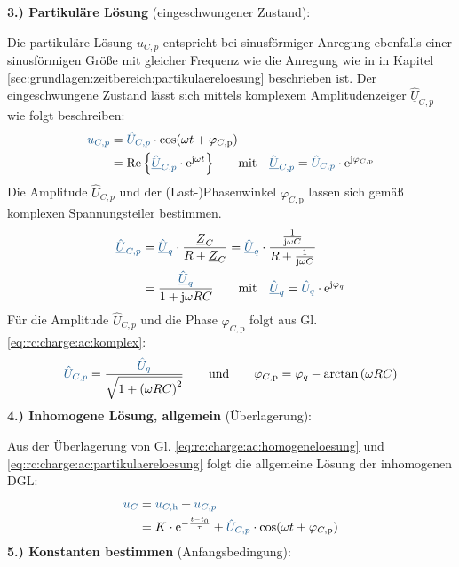 \begin{frame}[t]
{    \textbf{3.) Partikuläre Lösung} (eingeschwungener Zustand):

    Die partikuläre Lösung $u_{C,p}$ entspricht bei sinusförmiger Anregung ebenfalls einer sinusförmigen Größe
    mit gleicher Frequenz wie die Anregung wie in in Kapitel \ref{sec:grundlagen:zeitbereich:partikulaereloesung} beschrieben ist.
    Der eingeschwungene Zustand lässt sich mittels komplexem Amplitudenzeiger $\hat{\underline{U}}_{C,p}$ wie folgt beschreiben:
    \begin{align}
        \ecv{u_{C,p}}
            &= \ecv{\hat{U}_{C,p}} \cdot \cos(\omega t + \varphi_{C,\mathrm{p}})  \label{eq:rc:charge:ac:partikulaereloesung}\\
            &= \Re{\left\{ \ecv{\hat{\underline{U}}_{C,p}} \cdot \mathrm{e}^{\mathrm{j} \omega t} \right\}} \qquad \text{mit}\quad \ecv{\hat{\underline{U}}_{C,p}} = \ecv{\hat{U}_{C,p}} \cdot \mathrm{e}^{\mathrm{j} \varphi_{C,\mathrm{p}}}
    \end{align}
    Die Amplitude $\hat{U}_{C,p}$ und der (Last-)Phasenwinkel $\varphi_{C,\mathrm{p}}$ lassen sich gemäß komplexen Spannungsteiler bestimmen.
    \begin{align}
        \ecv{\hat{\underline{U}}_{C,p}}
            &= \ecv{\hat{\underline{U}}_q} \cdot \frac{\underline{Z}_C}{R + \underline{Z}_C}
            = \ecv{\hat{\underline{U}}_q} \cdot \frac{\frac{1}{\mathrm{j}\omega C}}{R + \frac{1}{\mathrm{j} \omega C}} \nonumber\\
            &= \frac{\ecv{\hat{\underline{U}}_q}}{1 + \mathrm{j} \omega R C}
            \qquad \text{mit}\quad \ecv{\hat{\underline{U}}_q} = \ecv{\hat{U}_q} \cdot \mathrm{e}^{\mathrm{j} \varphi_q}
            \label{eq:rc:charge:ac:komplex}
    \end{align}
    Für die Amplitude $\hat{U}_{C,p}$ und die Phase $\varphi_{C,\mathrm{p}}$ folgt aus Gl. \ref{eq:rc:charge:ac:komplex}:
    \begin{align}
        \ecv{\hat{U}_{C,p}} = \frac{\ecv{\hat{U}_q}}{\sqrt{1 + \left(\omega RC\right)^2}} \qquad\text{und}\qquad
        \varphi_{C,\mathrm{p}} = \varphi_q - \arctan\left(\omega RC\right) \label{rc:charge:ac:amplitudephase}
    \end{align}
    \textbf{4.) Inhomogene Lösung, allgemein} (Überlagerung):

    Aus der Überlagerung von Gl. \ref{eq:rc:charge:ac:homogeneloesung} und \ref{eq:rc:charge:ac:partikulaereloesung}
    folgt die allgemeine Lösung der inhomogenen DGL:
    \begin{align}
        \ecv{u_C} &= \ecv{u_{C,\mathrm{h}}} + \ecv{u_{C,p}} \nonumber\\
            &= K \cdot \mathrm{e}^{-\frac{t-t_0}{\tau}} + \ecv{\hat{U}_{C,p}} \cdot \cos(\omega t + \varphi_{C,\mathrm{p}}) \label{eq:rc:charge:ac:allg}
    \end{align}
    \textbf{5.) Konstanten bestimmen} (Anfangsbedingung):

}
\end{frame}
